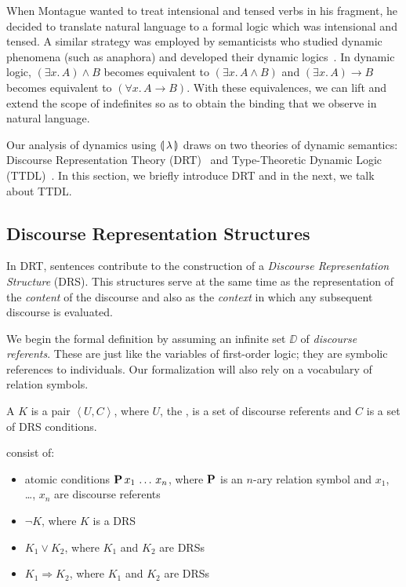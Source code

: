 When Montague wanted to treat intensional and tensed verbs in his fragment,
he decided to translate natural language to a formal logic which was
intensional and tensed. A similar strategy was employed by semanticists who
studied dynamic phenomena (such as anaphora) and developed their dynamic
logics~\cite{groenendijk1991dynamic,kamp1993discourse,de2006towards,lebedeva2012expression}. In
dynamic logic, $(\exists x.\, A) \land B$ becomes equivalent to
$(\exists x.\, A \land B)$ and $(\exists x.\, A) \to B$ becomes equivalent
to $(\forall x.\, A \to B)$. With these equivalences, we can lift and
extend the scope of indefinites so as to obtain the binding that we observe
in natural language.

Our analysis of dynamics using ${\llparenthesis \, \lambda \, \rrparenthesis}$ draws on two theories of dynamic
semantics: Discourse Representation Theory (DRT)~\cite{kamp1993discourse}
and Type-Theoretic Dynamic Logic
(TTDL)~\cite{de2006towards,lebedeva2012expression}. In this section, we
briefly introduce DRT and in the next, we talk about TTDL.


\subsection{Discourse Representation Structures}
\label{ssec:drt-drss}

In DRT, sentences contribute to the construction of a \emph{Discourse
  Representation Structure} (DRS). This structures serve at the same time
as the representation of the \emph{content} of the discourse and also as
the \emph{context} in which any subsequent discourse is evaluated.

We begin the formal definition by assuming an infinite set $\DD$ of
\emph{discourse referents}. These are just like the variables of
first-order logic; they are symbolic references to individuals. Our
formalization will also rely on a vocabulary of relation symbols.

\begin{definition}
  A  $K$ is a pair
  $\left< U, C \right>$, where $U$, the , is a set of
  discourse referents and $C$ is a set of DRS conditions.

   consist of:
  \begin{itemize}
  \item atomic conditions $\textbf{P}\,x_1\,\ldots\,x_n$, where
    $\textbf{P}$ is an $n$-ary relation symbol and $x_1$, \ldots, $x_n$
    are discourse referents
  \item $\lnot K$, where $K$ is a DRS
  \item $K_1 \lor K_2$, where $K_1$ and $K_2$ are DRSs
  \item $K_1 \Rightarrow K_2$, where $K_1$ and $K_2$ are DRSs
  \end{itemize}
\end{definition}

